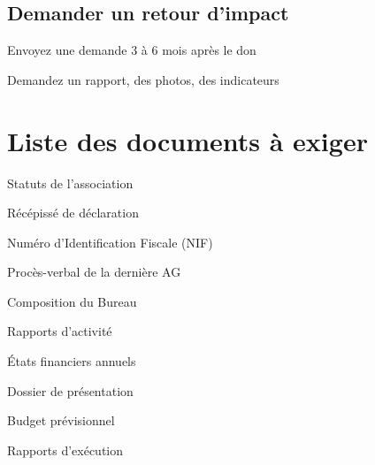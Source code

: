 \documentclass[12pt, a4paper]{article}
\begin{document}
\subsection{Demander un retour d'impact}
\begin{arrowlist}
    \item Envoyez une demande 3 à 6 mois après le don
    \item Demandez un rapport, des photos, des indicateurs
\end{arrowlist}

\newpage

\section{Liste des documents à exiger}

\begin{tcolorbox}[colback=darkgreen!5!white, colframe=darkgreen!75!black, title=\textbf{Catégorie 1 : Preuve d'existence légale}]
\begin{starredlist}
    \item Statuts de l'association
    \item Récépissé de déclaration
    \item Numéro d'Identification Fiscale (NIF)
\end{starredlist}
\end{tcolorbox}

\begin{tcolorbox}[colback=blue!5!white, colframe=blue!75!black, title=\textbf{Catégorie 2 : Gouvernance et transparence}]
\begin{starredlist}
    \item Procès-verbal de la dernière AG
    \item Composition du Bureau
    \item Rapports d'activité
    \item États financiers annuels
\end{starredlist}
\end{tcolorbox}

\begin{tcolorbox}[colback=orange!5!white, colframe=orange!75!black, title=\textbf{Catégorie 3 : Documents du projet}]
\begin{starredlist}
    \item Dossier de présentation
    \item Budget prévisionnel
    \item Rapports d'exécution
\end{starredlist}
\end{tcolorbox}
\end{document}
